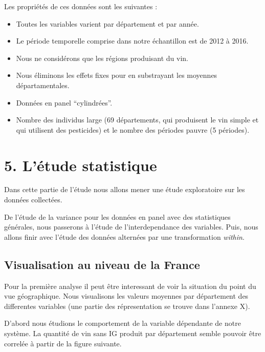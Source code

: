 \documentclass[11pt,]{article}
\providecommand{\tightlist}{%
  \setlength{\itemsep}{0pt}\setlength{\parskip}{0pt}}
\begin{document}
Les propriétés de ces données sont les suivantes :

\begin{itemize}
\tightlist
\item
  Toutes les variables varient par département et par année.
\item
  Le période temporelle comprise dans notre échantillon est de 2012 à
  2016.
\item
  Nous ne considérons que les régions produisant du vin.
\item
  Nous éliminons les effets fixes pour en substrayant les moyennes
  départamentales.
\item
  Données en panel ``cylindrées''.
\item
  Nombre des individus large (69 départements, qui produisent le vin
  simple et qui utilisent des pesticides) et le nombre des périodes
  pauvre (5 périodes).
\end{itemize}

\hypertarget{letude-statistique}{%
\section{5. L'étude statistique}\label{letude-statistique}}

Dans cette partie de l'étude nous allons mener une étude exploratoire
sur les données collectées.

De l'étude de la variance pour les données en panel avec des
statistiques générales, nous passerons à l'étude de l'interdependance
des variables. Puis, nous allons finir avec l'étude des données
alternées par une transformation \emph{within}.

\hypertarget{visualisation-au-niveau-de-la-france}{%
\subsection{Visualisation au niveau de la
France}\label{visualisation-au-niveau-de-la-france}}

Pour la première analyse il peut être interessant de voir la situation
du point du vue géographique. Nous visualisons les valeurs moyennes par
département des differentes variables (une partie des répresentation se
trouve dans l'annexe X).

D'abord nous étudions le comportement de la variable dépendante de notre
système. La quantité de vin sans IG produit par département semble
pouvoir être correlée à partir de la figure suivante.

\FloatBarrier
\end{document}
